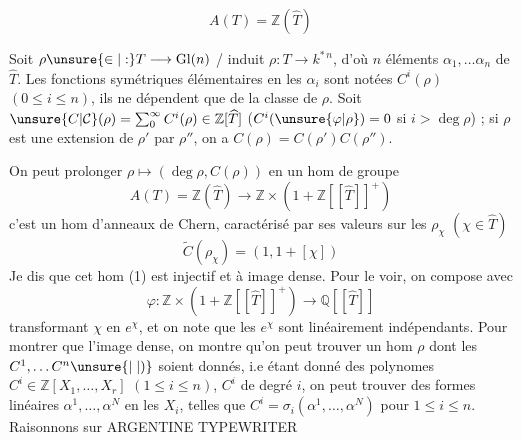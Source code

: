 \[
A(T)=\mathbb Z(\widehat T)
\]

Soit $\rho\unsure{\in|:}T\longrightarrow\operatorname{Gl}(n)$ / induit $\rho:T\longrightarrow k^{*\,n}$, d'où $n$ éléments
$\alpha_1,\ldots\alpha_n$ de $\widehat T$. Les fonctions symétriques élémentaires en
les $\alpha_i$ sont notées $C^i(\rho)$ $(0\leq i\leq n)$, ils ne dépendent
que de la classe de $\rho$. Soit $\unsure{C|\mathcal C}(\rho)=\sum_0^\infty C^i(\rho)\in\mathbb Z[\widehat T]$
($C^i(\unsure{\varphi|\rho})=0$ si $i>\deg\rho$) ; si $\rho$ est une extension de $\rho'$ par
$\rho''$, on a $C(\rho)=C(\rho')C(\rho'')$.

On peut prolonger $\rho\mapsto(\deg\rho,C(\rho))$ en un hom de groupe
\[
A(T)=\mathbb Z(\widehat T)\longrightarrow\mathbb Z\times(1+\mathbb Z[[\widehat T]]^+) \tag*{(1)}
\]
c'est un hom d'anneaux de Chern, caractérisé par
ses valeurs sur les $\rho_\chi$ $(\chi\in\widehat T)$
\[
\widetilde C(\rho_\chi)=(1,1+[\chi])
\]
Je dis que cet hom (1) est injectif  et à image
dense. Pour le voir, on compose avec \deleted{\unsure{$\varphi$}}
\[
\varphi:\mathbb Z\times(1+\mathbb Z[[\widehat T]]^+)\longrightarrow\mathbb Q[[\widehat T]]
\]
transformant $\chi$ en $e^\chi$, et on note que les
$e^\chi$ sont linéairement indépendants. Pour montrer que
l'image  dense, on montre qu'on peut trouver
un hom $\rho$ dont les $C^1,\ldots C^n\unsure{\mid|)}$ soient donnés,
i.e  étant donné des 
polynomes $C^i\in\mathbb Z[X_1,\ldots,X_r]$ $(1\leq i\leq n)$, $C^i$
de degré $i$, on peut trouver des formes linéaires
$\alpha^1,\ldots,\alpha^N$ en les $X_i$, telles que
$C^i=\sigma_i(\alpha^1,\ldots,\alpha^N)$ pour $1\leq i\leq n$. Raisonnons sur
 ARGENTINE  TYPEWRITER  
